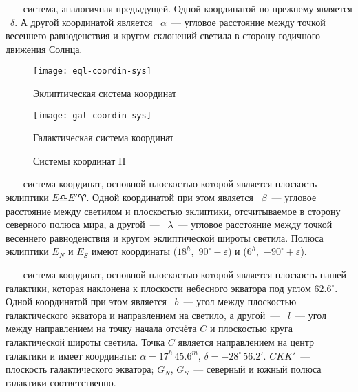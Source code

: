 ~--- система, аналогичная предыдущей. Одной координатой по прежнему является ~$\delta$. А другой координатой является ~$\alpha$~--- угловое расстояние между точкой весеннего равноденствия и кругом склонений светила в сторону годичного движения Солнца.

\begin{figure}[!h]
	\centering
	\begin{subcaptionblock}{0.49\textwidth}
		\texttt{[image: eql-coordin-sys]}
		\caption{Эклиптическая система координат}
	\end{subcaptionblock}
	\hfill
	\begin{subcaptionblock}{0.49\textwidth}
		\texttt{[image: gal-coordin-sys]}
		\caption{Галактическая система координат}
	\end{subcaptionblock}
	\caption{Системы координат II}
\end{figure}
~--- система координат, основной плоскостью которой является плоскость эклиптики $E \libra E' \aries $. Одной координатой при этом является ~$\beta$~--- угловое расстояние между светилом и плоскостью эклиптики, отсчитываемое в сторону северного полюса мира, а другой~--- ~$\lambda$~--- угловое расстояние между точкой весеннего равноденствия и кругом эклиптической широты светила. Полюса эклиптики $E_N$ и $E_S$ имеют координаты ($18^h$,~$90^\circ - \varepsilon$) и ($6^h$,~$-90^\circ + \varepsilon$).

~--- система координат, основной плоскостью которой является плоскость нашей галактики, которая наклонена к плоскости небесного экватора под углом $62.6^\circ$. Одной координатой при этом является ~$b$~--- угол между плоскостью галактического экватора и направлением на светило, а другой~--- ~$l$~--- угол между направлением на точку начала отсчёта $C$ и плоскостью круга галактической широты светила. Точка $C$ является направлением на центр галактики и имеет координаты: $\alpha=17^h\,45.6^m$, $\delta=-28^{\circ}\,56.2'$. $C K K'$~--- плоскость галактического экватора; $G_N$, $G_S$~--- северный и южный полюса галактики соответственно.
